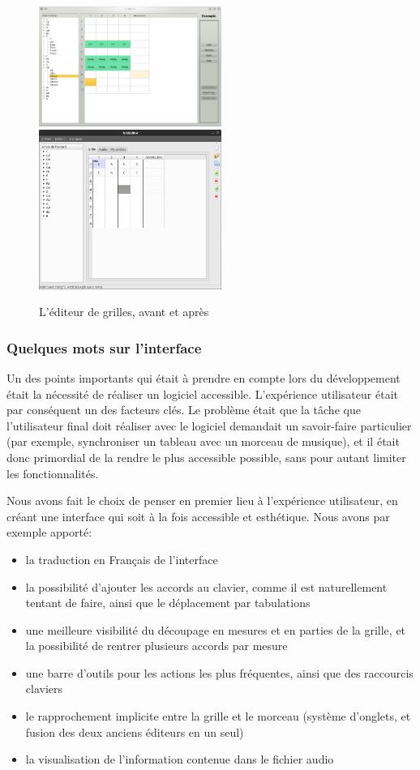 \begin{figure}[H]
\begin{center}
\includegraphics[width=225px]{ancien_editeur.png}
\includegraphics[width=225px]{nouveau_editeur.png}
\caption{L'éditeur de grilles, avant et après}
\label{av_ap_editeur}
\end{center}
\end{figure}


\subsubsection*{Quelques mots sur l'interface}

Un des points importants qui était à prendre en compte lors du développement était la nécessité de réaliser un logiciel accessible. L'expérience utilisateur était par conséquent un des facteurs clés. Le problème était que la tâche que l'utilisateur final doit réaliser avec le logiciel demandait un savoir-faire particulier (par exemple, synchroniser un tableau avec un morceau de musique), et il était donc primordial de la rendre le plus accessible possible, sans pour autant limiter les fonctionnalités.

Nous avons fait le choix de penser en premier lieu à l'expérience utilisateur, en créant une interface qui soit à la fois accessible et esthétique. Nous avons par exemple apporté:
\begin{itemize}
 \item la traduction en Français de l'interface
 \item la possibilité d'ajouter les accords au clavier, comme il est naturellement tentant de faire, ainsi que le déplacement par tabulations
 \item une meilleure visibilité du découpage en mesures et en parties de la grille, et la possibilité de rentrer plusieurs accords par mesure
 \item une barre d'outils pour les actions les plus fréquentes, ainsi que des raccourcis claviers
 \item le rapprochement implicite entre la grille et le morceau (système d'onglets, et fusion des deux anciens éditeurs en un seul)
 \item la visualisation de l'information contenue dans le fichier audio
\end{itemize}

